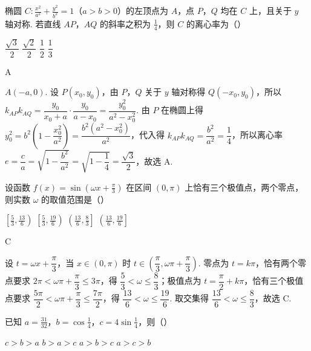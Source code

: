 \begin{problem}
椭圆 \(C:\frac{x^2}{a^2}+\frac{y^2}{b^2}=1\)（\(a>b>0\)）的左顶点为 \(A\)，点 \(P\)，\(Q\) 均在 \(C\) 上，且关于 \(y\) 轴对称. 若直线 \(AP\)，\(AQ\) 的斜率之积为 \(\frac14\)，则 \(C\) 的离心率为（\quad）

\choices
    {\( \dfrac{\sqrt3}{2}\)}
    {\( \dfrac{\sqrt2}{2}\)}
    {\( \dfrac{1}{2}\)}
    {\(\dfrac{1}{3}\)}
\end{problem}

\begin{answer}
A
\end{answer}

\begin{solution}
\(A(-a,0)\). 设 \(P(x_0,y_0)\)，由 \(P\)，\(Q\) 关于 \(y\) 轴对称得 \(Q(-x_0,y_0)\)，所以 \(k_{AP}k_{AQ}=\dfrac{y_0}{x_0+a}\cdot\dfrac{y_0}{a-x_0}=\dfrac{y_0^2}{a^2-x_0^2}\). 由 \(P\) 在椭圆上得 \(y_0^2=b^2\left(1-\dfrac{x_0^2}{a^2}\right)=\dfrac{b^2(a^2-x_0^2)}{a^2}\)，代入得 \(k_{AP}k_{AQ}=\dfrac{b^2}{a^2}=\dfrac14\)，所以离心率 \(e=\dfrac ca=\sqrt{1-\dfrac{b^2}{a^2}}=\sqrt{1-\dfrac14}=\dfrac{\sqrt3}{2}\)，故选 A.
\end{solution}

\begin{problem}
设函数 \(f(x)=\sin\left(\omega x+\frac\pi3\right)\) 在区间 \((0,\pi)\) 上恰有三个极值点，两个零点，则实数 \(\omega\) 的取值范围是（\quad）

\choices
    {\(\left[\frac53,\frac{13}6\right)\)}
    {\(\left[\frac53,\frac{19}6\right)\)}
    {\(\left(\frac{13}6,\frac83\right]\)}
    {\(\left(\frac{13}6,\frac{19}6\right]\)}
\end{problem}

\begin{answer}
C
\end{answer}

\begin{solution}
设 \(t=\omega x+\dfrac\pi3\)，当 \(x\in(0,\pi)\) 时 \(t\in\left(\dfrac\pi3,\omega\pi+\dfrac\pi3\right)\). 零点为 \(t=k\pi\)，恰有两个零点要求 \(2\pi<\omega\pi+\dfrac\pi3\le3\pi\)，得 \(\dfrac53<\omega\le\dfrac83\)；极值点为 \(t=\dfrac\pi2+k\pi\)，恰有三个极值点要求 \(\dfrac{5\pi}{2}<\omega\pi+\dfrac\pi3\le\dfrac{7\pi}{2}\)，得 \(\dfrac{13}6<\omega\le\dfrac{19}6\). 取交集得 \(\dfrac{13}6<\omega\le\dfrac83\)，故选 C.
\end{solution}

\begin{problem}
已知 \(a=\frac{31}{32}\)，\(b=\cos\frac14\)，\(c=4\sin\frac14\)，则（\quad）

\choices
    {\(c>b>a\)}
    {\(b>a>c\)}
    {\(a>b>c\)}
    {\(a>c>b\)}
\end{problem}

